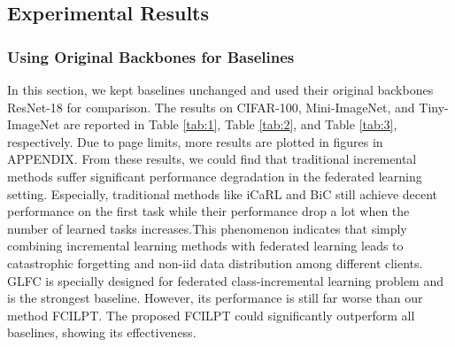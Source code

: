 \documentclass[sigconf,anonymous,review,screen]{acmart}
\begin{document}
\subsection{Experimental Results}
\subsubsection{Using Original Backbones for Baselines} \label{Original Backbones for Baselines}
In this section, we kept baselines unchanged and used their original backbones ResNet-18 for comparison. The results on CIFAR-100, Mini-ImageNet, and Tiny-ImageNet are reported in Table \ref{tab:1}, Table \ref{tab:2}, and Table \ref{tab:3}, respectively. Due to page limits, more results are plotted in figures in APPENDIX. From these results, we could find that traditional incremental methods suffer significant performance degradation in the federated learning setting. Especially, traditional methods like iCaRL and BiC still achieve decent performance on the first task while their performance drop a lot when the number of learned tasks increases.This phenomenon indicates that simply combining incremental learning methods with federated learning leads to catastrophic forgetting and non-iid data distribution among different clients. GLFC is specially designed for federated class-incremental learning problem and is the strongest baseline. However, its performance is still far worse than our method FCILPT. The proposed FCILPT could significantly outperform all baselines, showing its effectiveness. 





%
\end{document}
